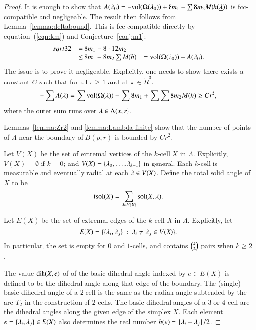 \begin{proof} 
It is enough to show that $A(\lambda_0)  = -{\operatorname{vol}}(\Omega(\lambda_0)) + 8 m_1 - \sum 8 m_2 M(h({\underline{\lambda}}))$ is fcc-compatible and negligeable.  The
result then follows from Lemma~\ref{lemma:deltabound}.  
This is fcc-compatible directly
by equation~(\ref{eqn:km})
and Conjecture~\ref{conj:m1}:
$$
\begin{array}{lll}
sqrt{32} &= 8 m_1 - 8\cdot 12 m_2\\
  &\le 8 m_1 - 8 m_2 \sum M(h)
  &= {\operatorname{vol}}(\Omega(\lambda_0)) + A(\lambda_0).
\end{array}
$$  
The issue is to prove it negligeable.  Explicitly, one needs
to show there exists a constant  $C$ such that for all $r\ge 1$ and all $x\in\ring{R}^3$:
\begin{equation}\label{eqn:neg}
  -\sum A(\lambda) = \sum {\operatorname{vol}}(\Omega(\lambda)) -\sum 8m_1 + \sum \sum 8 m_2 M(h) \ge C r^2,
\end{equation}
where the outer sum runs over $\lambda\in \Lambda(x,r)$.

Lemmas~\ref{lemma:Zr2} and \ref{lemma:Lambda-finite}  show that the number of points of $\Lambda$ near the boundary of $B(p,r)$ is bounded by $C r^2$.

Let $V(X)$ be the set of extremal vertices of the $k$-cell $X$ in $\Lambda$.  Explicitly, $V(X)=\emptyset$ if $k=0$; and $V(X) = \{\lambda_0,\ldots,\lambda_{k-1}\}$ in general.  Each $k$-cell is measurable and eventually
radial at each $\lambda\in V(X)$.  Define the total solid angle of $X$ to be
$$
{\operatorname{tsol}}(X) = \sum_{\lambda\in V(X)} \operatorname{sol}(X,\lambda).
$$

Let $E(X)$ be the set of extremal edges of the $k$-cell $X$ in $\Lambda$.  Explicitly, let 
$$E(X)=\{\{\lambda_i,\lambda_j\}\ :\  \lambda_i\ne\lambda_j\in V(X)\}.$$
In particular, the set is empty for $0$ and $1$-cells, and contains
$\tbinom{k}{2}$ pairs when $k\ge 2$.


The value
$\operatorname{dih}(X,e)$ of
of the basic dihedral angle indexed by $e\in E(X)$ is defined to be the dihedral angle along that edge
of the boundary.  
The (single) basic  dihedral angle of a $2$-cell is
the same as the radian angle subtended by the arc $T_2$ in the construction of $2$-cells.
The basic dihedral angles of a $3$ or $4$-cell are the dihedral angles along the given edge of the simplex $X$. 
Each element $e=\{\lambda_i,\lambda_j\}\in E(X)$ also determines
the real number $h(e) = {\hskip0.1em|\hskip-0.15em|\hskip0.1em}\lambda_i - \lambda_j{\hskip0.1em|\hskip-0.15em|\hskip0.1em}/2$.


\end{proof}
